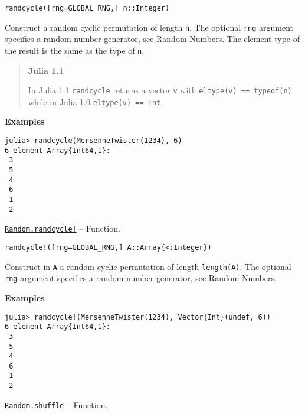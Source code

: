 \begin{adjustwidth}{2em}{0pt}


\begin{verbatim}
randcycle([rng=GLOBAL_RNG,] n::Integer)
\end{verbatim}

Construct a random cyclic permutation of length \texttt{n}. The optional \texttt{rng} argument specifies a random number generator, see \href{@ref}{Random Numbers}. The element type of the result is the same as the type of \texttt{n}.

\begin{quote}
\textbf{Julia 1.1}

In Julia 1.1 \texttt{randcycle} returns a vector \texttt{v} with \texttt{eltype(v) == typeof(n)} while in Julia 1.0 \texttt{eltype(v) == Int}.

\end{quote}
\textbf{Examples}


\begin{verbatim}
julia> randcycle(MersenneTwister(1234), 6)
6-element Array{Int64,1}:
 3
 5
 4
 6
 1
 2
\end{verbatim}



\end{adjustwidth}
\hypertarget{6946208329788361422}{} 
\hyperlink{6946208329788361422}{\texttt{Random.randcycle!}}  -- {Function.}

\begin{adjustwidth}{2em}{0pt}


\begin{verbatim}
randcycle!([rng=GLOBAL_RNG,] A::Array{<:Integer})
\end{verbatim}

Construct in \texttt{A} a random cyclic permutation of length \texttt{length(A)}. The optional \texttt{rng} argument specifies a random number generator, see \href{@ref}{Random Numbers}.

\textbf{Examples}


\begin{verbatim}
julia> randcycle!(MersenneTwister(1234), Vector{Int}(undef, 6))
6-element Array{Int64,1}:
 3
 5
 4
 6
 1
 2
\end{verbatim}



\end{adjustwidth}
\hypertarget{16742615893822221762}{} 
\hyperlink{16742615893822221762}{\texttt{Random.shuffle}}  -- {Function.}


